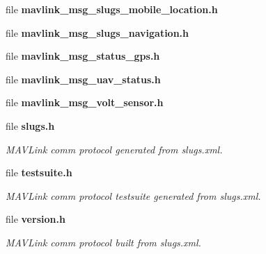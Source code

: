 \begin{DoxyCompactItemize}
\item 
file \textbf{ mavlink\+\_\+msg\+\_\+slugs\+\_\+mobile\+\_\+location.\+h}
\item 
file \textbf{ mavlink\+\_\+msg\+\_\+slugs\+\_\+navigation.\+h}
\item 
file \textbf{ mavlink\+\_\+msg\+\_\+status\+\_\+gps.\+h}
\item 
file \textbf{ mavlink\+\_\+msg\+\_\+uav\+\_\+status.\+h}
\item 
file \textbf{ mavlink\+\_\+msg\+\_\+volt\+\_\+sensor.\+h}
\item 
file \textbf{ slugs.\+h}
\begin{DoxyCompactList}\small\item\em M\+A\+V\+Link comm protocol generated from slugs.\+xml. \end{DoxyCompactList}\item 
file \textbf{ testsuite.\+h}
\begin{DoxyCompactList}\small\item\em M\+A\+V\+Link comm protocol testsuite generated from slugs.\+xml. \end{DoxyCompactList}\item 
file \textbf{ version.\+h}
\begin{DoxyCompactList}\small\item\em M\+A\+V\+Link comm protocol built from slugs.\+xml. \end{DoxyCompactList}\end{DoxyCompactItemize}
